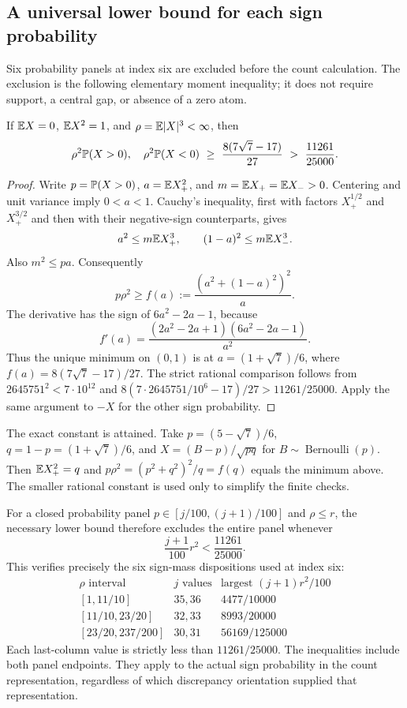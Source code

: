 \subsection{A universal lower bound for each sign probability}
\label{ext:sign-mass}
Six probability panels at index six are excluded before the count
calculation. The exclusion is the following elementary moment inequality;
it does not require support, a central gap, or absence of a zero atom.

\begin{lemma}\label{ext:sign-mass-bound}
If $\mathbb E X=0$, $\mathbb E X^2=1$, and $\rho=\mathbb E|X|^3<\infty$, then
\[
 \rho^2\mathbb P(X>0),\quad \rho^2\mathbb P(X<0)
 \ \ge\ \frac{8(7\sqrt7-17)}{27}
 \ >\ \frac{11261}{25000}.
\]
\end{lemma}
\begin{proof}
Write $p=\mathbb P(X>0)$, $a=\mathbb E X_+^2$, and
$m=\mathbb E X_+=\mathbb E X_->0$. Centering and unit variance imply
$0<a<1$. Cauchy's inequality, first with factors
$X_+^{1/2}$ and $X_+^{3/2}$ and then with their negative-sign
counterparts, gives
\[
 a^2\le m\mathbb E X_+^3,\qquad (1-a)^2\le m\mathbb E X_-^3.
\]
Also $m^2\le pa$. Consequently
\[
 p\rho^2\ge f(a):=\frac{(a^2+(1-a)^2)^2}{a}.
\]
The derivative has the sign of $6a^2-2a-1$, because
\[
 f'(a)=\frac{(2a^2-2a+1)(6a^2-2a-1)}{a^2}.
\]
Thus the unique minimum on $(0,1)$ is at
$a=(1+\sqrt7)/6$, where
$f(a)=8(7\sqrt7-17)/27$. The strict rational comparison follows
from $2645751^2<7\cdot10^{12}$ and
$8(7\cdot2645751/10^6-17)/27>11261/25000$.
Apply the same argument to $-X$ for the other sign probability.
\end{proof}

The exact constant is attained. Take
$p=(5-\sqrt7)/6$, $q=1-p=(1+\sqrt7)/6$, and
$X=(B-p)/\sqrt{pq}$ for $B\sim\operatorname{Bernoulli}(p)$.
Then $\mathbb E X_+^2=q$ and
$p\rho^2=(p^2+q^2)^2/q=f(q)$ equals the minimum above.
The smaller rational constant is used only to simplify the finite checks.

For a closed probability panel $p\in[j/100,(j+1)/100]$ and
$\rho\le r$, the necessary lower bound therefore excludes the
entire panel whenever
\[
 \frac{j+1}{100}r^2<\frac{11261}{25000}.
\]
This verifies precisely the six sign-mass dispositions used at index six:
\[
\begin{array}{c|c|c}
\rho\text{ interval}&j\text{ values}&
\text{largest }(j+1)r^2/100\\\hline
{[1,11/10]}&35,36&4477/10000\\
{[11/10,23/20]}&32,33&8993/20000\\
{[23/20,237/200]}&30,31&56169/125000
\end{array}
\]
Each last-column value is strictly less than $11261/25000$.
The inequalities include both panel endpoints. They apply to the
actual sign probability in the count representation, regardless of
which discrepancy orientation supplied that representation.

